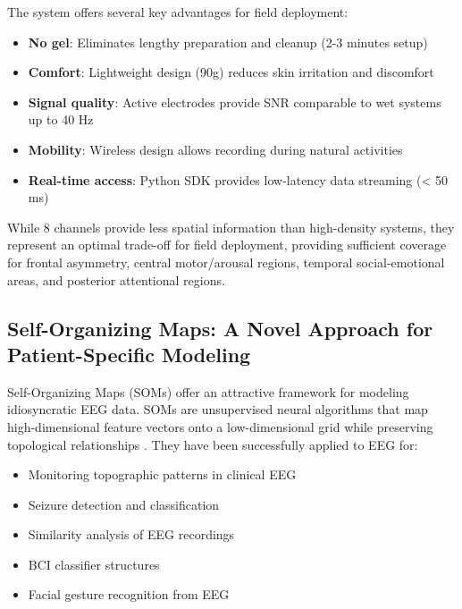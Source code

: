 The system offers several key advantages for field deployment:
\begin{itemize}
    \item \textbf{No gel}: Eliminates lengthy preparation and cleanup (2-3 minutes setup)
    \item \textbf{Comfort}: Lightweight design (90g) reduces skin irritation and discomfort
    \item \textbf{Signal quality}: Active electrodes provide SNR comparable to wet systems up to 40 Hz
    \item \textbf{Mobility}: Wireless design allows recording during natural activities
    \item \textbf{Real-time access}: Python SDK provides low-latency data streaming (< 50 ms)
\end{itemize}

While 8 channels provide less spatial information than high-density systems, they represent an optimal trade-off for field deployment, providing sufficient coverage for frontal asymmetry, central motor/arousal regions, temporal social-emotional areas, and posterior attentional regions.

\subsection{Self-Organizing Maps: A Novel Approach for Patient-Specific Modeling}

Self-Organizing Maps (SOMs) offer an attractive framework for modeling idiosyncratic EEG data. SOMs are unsupervised neural algorithms that map high-dimensional feature vectors onto a low-dimensional grid while preserving topological relationships \cite{kaski1993som_eeg}. They have been successfully applied to EEG for:

\begin{itemize}
    \item Monitoring topographic patterns in clinical EEG \cite{joutsiniemi1995som_eeg}
    \item Seizure detection and classification \cite{elo1992som_epileptic}
    \item Similarity analysis of EEG recordings \cite{jahan2014som_similarity}
    \item BCI classifier structures \cite{som_bci_classifier_2015}
    \item Facial gesture recognition from EEG \cite{kawaguchi2024som_facial}
\end{itemize}

